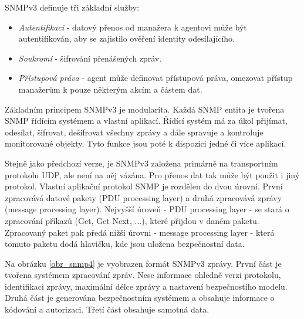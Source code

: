 SNMPv3 definuje tři základní služby:
\begin{itemize}
	\item \textit{Autentifikaci} - datový přenos od manažera k agentovi může být autentifikován, aby se zajistilo ověření identity odesílajícího.
	\item \textit{Soukromí} - šifrování přenášených zpráv.
	\item \textit{Přístupová práva} - agent může definovat přístupová práva, omezovat přístup manažerům k pouze některým akcím a částem dat.
\end{itemize}

Základním principem SNMPv3 je modularita. Každá SNMP entita je tvořena SNMP řídícím systémem a vlastní aplikací. Řídící systém má za úkol 
přijímat, odesílat, šifrovat, dešifrovat všechny zprávy a dále spravuje a kontroluje monitorované objekty. Tyto funkce jsou poté k dispozici jedné či více
aplikací.

Stejně jako předchozí verze, je SNMPv3 založena primárně na transportním protokolu UDP, ale není na něj vázána. Pro přenos dat tak může být použit i jiný protokol.
Vlastní aplikační protokol SNMP je rozdělen do dvou úrovní. První zpracovává datové pakety (PDU processing layer) a druhá zpracovává zprávy (message processing layer).
Nejvyšší úroveň - PDU processing layer - se stará o zpracování příkazů (Get, Get Next, ...), které přijdou v daném paketu. Zpracovaný paket pak předá nižší úrovni - 
message processing layer - která tomuto paketu dodá hlavičku, kde jsou uložena bezpečnostní data.

Na obrázku \ref{obr_snmp4} je vyobrazen formát SNMPv3 zprávy. První část je tvořena systémem zpracování zpráv. Nese informace ohledně verzi protokolu, identifikaci zprávy,
maximální délce zprávy a nastavení bezpečnostího modelu. Druhá část je generována bezpečnostním systémem a obsahuje informace o kódování a autorizaci. Třetí část obsahuje samotná 
data.

